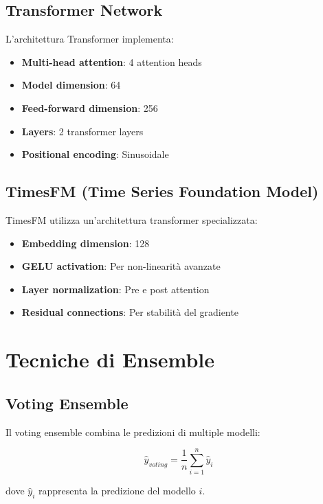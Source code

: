 \documentclass[12pt,a4paper,twoside]{report}
\begin{document}
\subsection{Transformer Network}

L'architettura Transformer implementa:

\begin{itemize}
    \item \textbf{Multi-head attention}: 4 attention heads
    \item \textbf{Model dimension}: 64
    \item \textbf{Feed-forward dimension}: 256
    \item \textbf{Layers}: 2 transformer layers
    \item \textbf{Positional encoding}: Sinusoidale
\end{itemize}

\subsection{TimesFM (Time Series Foundation Model)}

TimesFM utilizza un'architettura transformer specializzata:

\begin{itemize}
    \item \textbf{Embedding dimension}: 128
    \item \textbf{GELU activation}: Per non-linearità avanzate
    \item \textbf{Layer normalization}: Pre e post attention
    \item \textbf{Residual connections}: Per stabilità del gradiente
\end{itemize}

\section{Tecniche di Ensemble}

\subsection{Voting Ensemble}

Il voting ensemble combina le predizioni di multiple modelli:

\begin{equation}
\hat{y}_{voting} = \frac{1}{n} \sum_{i=1}^{n} \hat{y}_i
\end{equation}

dove $\hat{y}_i$ rappresenta la predizione del modello $i$.
\end{document}
